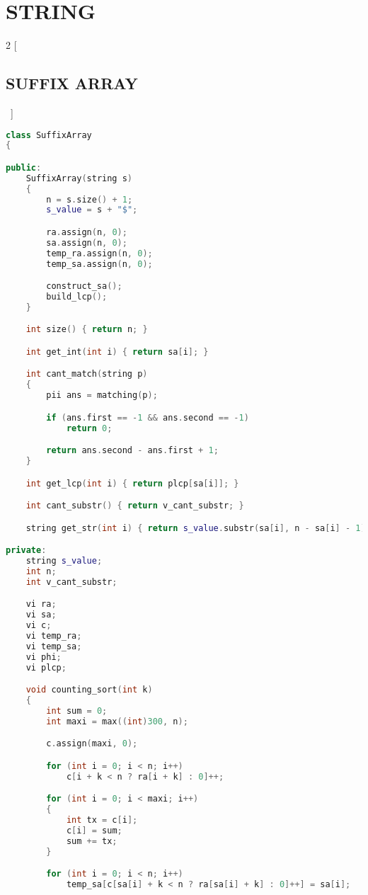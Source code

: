\documentclass[leter]{amsart}
\begin{document}
\enlargethispage*{\baselineskip}\section{STRING}
\begin{multicols}{2}
[\subsection{SUFFIX ARRAY}\ ]
\begin{lstlisting}[language=C++]
class SuffixArray
{

public:
    SuffixArray(string s)
    {
        n = s.size() + 1;
        s_value = s + "$";

        ra.assign(n, 0);
        sa.assign(n, 0);
        temp_ra.assign(n, 0);
        temp_sa.assign(n, 0);

        construct_sa();
        build_lcp();
    }

    int size() { return n; }

    int get_int(int i) { return sa[i]; }

    int cant_match(string p)
    {
        pii ans = matching(p);

        if (ans.first == -1 && ans.second == -1)
            return 0;

        return ans.second - ans.first + 1;
    }

    int get_lcp(int i) { return plcp[sa[i]]; }

    int cant_substr() { return v_cant_substr; }

    string get_str(int i) { return s_value.substr(sa[i], n - sa[i] - 1); }

private:
    string s_value;
    int n;
    int v_cant_substr;

    vi ra;
    vi sa;
    vi c;
    vi temp_ra;
    vi temp_sa;
    vi phi;
    vi plcp;

    void counting_sort(int k)
    {
        int sum = 0;
        int maxi = max((int)300, n);

        c.assign(maxi, 0);

        for (int i = 0; i < n; i++)
            c[i + k < n ? ra[i + k] : 0]++;

        for (int i = 0; i < maxi; i++)
        {
            int tx = c[i];
            c[i] = sum;
            sum += tx;
        }

        for (int i = 0; i < n; i++)
            temp_sa[c[sa[i] + k < n ? ra[sa[i] + k] : 0]++] = sa[i];


\end{lstlisting}
\end{multicols}
\end{document}
